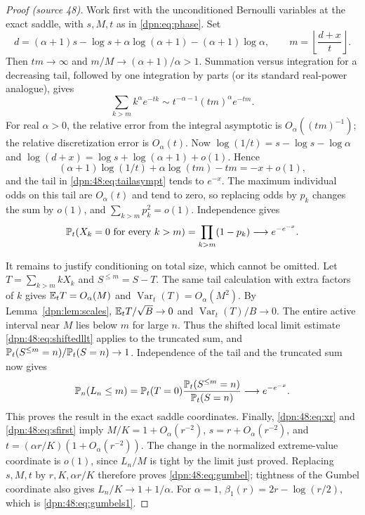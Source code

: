 \documentclass[11pt]{article}
\numberwithin{equation}{section}
\theoremstyle{definition}\newtheorem{definition}[theorem]{Definition}
\theoremstyle{remark}\newtheorem{remark}[theorem]{Remark}
\DeclareMathOperator{\Var}{Var}
\newcommand{\src}[1]{\textup{(source #1)}}
\begin{document}
\begin{proof}[Proof \src{48}]
Work first with the unconditioned Bernoulli variables at the exact saddle,
with $s,M,t$ as in \eqref{dpn:eq:phase}.  Set
\[
 d=(\alpha+1)s-\log s+\alpha\log(\alpha+1)-(\alpha+1)\log\alpha,
 \qquad m=\left\lfloor\frac{d+x}{t}\right\rfloor.
\]
Then $tm\to\infty$ and $m/M\to(\alpha+1)/\alpha>1$.  Summation versus
integration for a decreasing tail, followed by one integration by parts (or
its standard real-power analogue), gives
\begin{equation}\label{dpn:48:eq:tailasympt}
 \sum_{k>m}k^\alpha e^{-tk}
   \sim t^{-\alpha-1}(tm)^\alpha e^{-tm}.
\end{equation}
For real $\alpha>0$, the relative error from the integral asymptotic is
$O_\alpha((tm)^{-1})$; the relative discretization error is $O_\alpha(t)$.
Now $\log(1/t)=s-\log s-\log\alpha$ and
$\log(d+x)=\log s+\log(\alpha+1)+o(1)$.  Hence
\[
 (\alpha+1)\log(1/t)+\alpha\log(tm)-tm=-x+o(1),
\]
and the tail in \eqref{dpn:48:eq:tailasympt} tends to $e^{-x}$.  The maximum
individual odds on this tail are $O_\alpha(t)$ and tend to zero, so replacing
odds by $p_k$ changes the sum by $o(1)$, and $\sum_{k>m}p_k^2=o(1)$.
Independence gives
\[
 \mathbb P_t(X_k=0\text{ for every }k>m)=\prod_{k>m}(1-p_k)\longrightarrow e^{-e^{-x}}.
\]

It remains to justify conditioning on total size, which cannot be omitted.
Let $T=\sum_{k>m}kX_k$ and $S^{\le m}=S-T$.  The same tail calculation with
extra factors of $k$ gives $\mathbb E_tT=O_\alpha(M)$ and $\Var_t(T)=O_\alpha(M^2)$.
By Lemma~\ref{dpn:lem:scales}, $\mathbb E_tT/\sqrt B\to0$ and $\Var_t(T)/B\to0$.  The
entire active interval near $M$ lies below $m$ for large $n$.  Thus the
shifted local limit estimate \eqref{dpn:48:eq:shiftedllt} applies to the
truncated sum, and $\mathbb P_t(S^{\le m}=n)/\mathbb P_t(S=n)\to1$.  Independence of
the tail and the truncated sum now gives
\[
 \mathbb P_n(L_n\le m)
 =\mathbb P_t(T=0)\frac{\mathbb P_t(S^{\le m}=n)}{\mathbb P_t(S=n)}
 \longrightarrow e^{-e^{-x}}.
\]
This proves the result in the exact saddle coordinates.  Finally,
\eqref{dpn:48:eq:xr} and \eqref{dpn:48:eq:sfirst} imply $M/K=1+O_\alpha(r^{-2})$,
$s=r+O_\alpha(r^{-2})$, and $t=(\alpha r/K)(1+O_\alpha(r^{-2}))$.  The change in
the normalized extreme-value coordinate is $o(1)$, since $L_n/M$ is tight by
the limit just proved.  Replacing $s,M,t$ by $r,K,\alpha r/K$ therefore proves
\eqref{dpn:48:eq:gumbel}; tightness of the Gumbel coordinate also gives
$L_n/K\to1+1/\alpha$.  For $\alpha=1$, $\beta_1(r)=2r-\log(r/2)$, which is
\eqref{dpn:48:eq:gumbels1}.
\end{proof}
\end{document}
